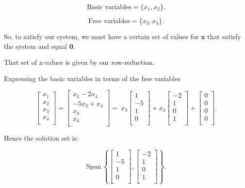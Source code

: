 \documentclass{article}
\begin{document}
\[
    \text{Basic variables} = \{ x_1, x_2 \}
.\]


\[
    \text{Free variables} = \{ x_3, x_4 \}
.\]


So, to satisfy our system, we must have a certain set of values for $\mathbf{x}$
that satisfy the system and equal $\mathbf{0}$.

That set of x-values is given by our row-reduction.

Expressing the basic variables in terms of the free variables

\[
    \begin{bmatrix}
        x_1 \\ x_2 \\ x_3 \\ x_4 \\
    \end{bmatrix}
    =
    \begin{bmatrix}
        x_3 - 2 x_4     \\
        -5 x_3 + x_4    \\ 
        x_3 \\ x_4      \\
    \end{bmatrix}
    = \
    x_3
    \begin{bmatrix}
        1 \\ -5 \\ 1 \\ 0 \\
    \end{bmatrix}
    + 
    x_4
    \begin{bmatrix}
        -2 \\ 1 \\ 0 \\ 1 \\
    \end{bmatrix}
    +
    \begin{bmatrix}
        0 \\ 0 \\ 0 \\ 0 \\
    \end{bmatrix}
.\]


Hence the solution set is:

\[
    \text{Span} \
    \left\{ 
    \begin{bmatrix}
        1 \\ -5 \\ 1 \\ 0 \\
    \end{bmatrix}
    ,
    \begin{bmatrix}
        -2 \\ 1 \\ 0 \\ 1 \\
    \end{bmatrix}
    \right\}
.\]
\end{document}
